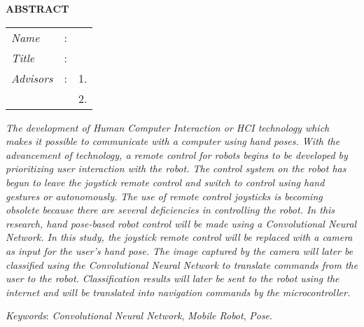 \begin{center}
  \large\textbf{ABSTRACT}
\end{center}


\vspace{2ex}

\begingroup
\setlength{\tabcolsep}{0pt}

\noindent
\begin{tabularx}{\textwidth}{l >{\centering}m{3em} X}
  \emph{Name}     & : & \name{}         \\

  \emph{Title}    & : & \engtatitle{}   \\

  \emph{Advisors} & : & 1. \advisor{}   \\
                  &   & 2. \coadvisor{} \\
\end{tabularx}
\endgroup

\emph{The development of Human Computer Interaction or HCI technology which makes it possible to communicate with a computer using hand poses. With the advancement of technology, a remote control for robots begins to be developed by prioritizing user interaction with the robot. The control system on the robot has begun to leave the joystick remote control and switch to control using hand gestures or autonomously. The use of remote control joysticks is becoming obsolete because there are several deficiencies in controlling the robot. In this research, hand pose-based robot control will be made using a Convolutional Neural Network. In this study, the joystick remote control will be replaced with a camera as input for the user's hand pose. The image captured by the camera will later be classified using the Convolutional Neural Network to translate commands from the user to the robot. Classification results will later be sent to the robot using the internet and will be translated into navigation commands by the microcontroller.}

\vspace{2ex}
\noindent
\emph{Keywords}: \emph{Convolutional Neural Network}, \emph{Mobile Robot}, \emph{Pose}.
